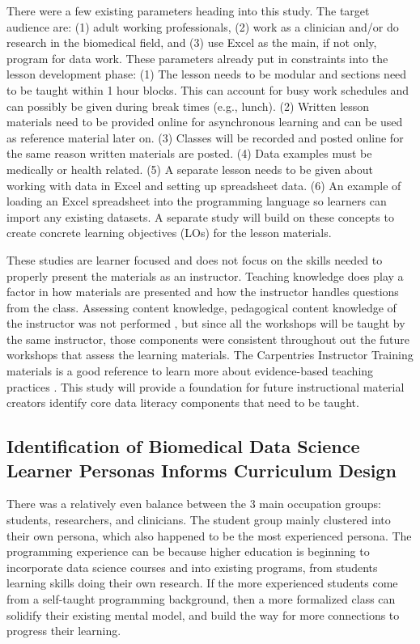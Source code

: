 \documentclass[020-persona\_validation.tex]{subfiles}
\begin{document}
    
    There were a few existing parameters heading into this study.
    The target audience are:
    (1) adult working professionals,
    (2) work as a clinician and/or do research in the biomedical field, and
    (3) use Excel as the main, if not only, program for data work.
    These parameters already put in constraints into the lesson development phase:
    (1) The lesson needs to be modular and sections need to be taught within 1 hour blocks.
    This can account for busy work schedules and can possibly be given during break times (e.g., lunch).
    (2) Written lesson materials need to be provided online for asynchronous learning and can be used as reference material later on.
    (3) Classes will be recorded and posted online for the same reason written materials are posted.
    (4) Data examples must be medically or health related.
    (5) A separate lesson needs to be given about working with data in Excel and setting up spreadsheet data.
    (6) An example of loading an Excel spreadsheet into the programming language so learners can import any existing datasets.
    A separate study will build on these concepts to create concrete learning objectives (LOs) for the lesson materials.
    
    These studies are learner focused and does not focus on the skills needed to properly present the materials as an instructor.
    Teaching knowledge does play a factor in how materials are presented and how the instructor handles questions from the class.
    Assessing content knowledge, pedagogical content knowledge of the instructor was not performed
    \cite{shulmanThoseWhoUnderstand1986},
    but since all the workshops will be taught by the same instructor, those components were consistent throughout out
    the future workshops that assess the learning materials.
    The Carpentries Instructor Training materials is a good reference to learn more about evidence-based teaching practices
    \cite{Koch2016}.
    This study will provide a foundation for future instructional material creators identify core data literacy components
    that need to be taught.

    \subsection{Identification of Biomedical Data Science Learner Personas Informs Curriculum Design}

        There was a relatively even balance between the 3 main occupation groups: students, researchers, and clinicians.
        The student group mainly clustered into their own persona,
        which also happened to be the most experienced persona.
        The programming experience can be because higher education is beginning to incorporate data science courses and
        into existing programs,
        from students learning skills doing their own research.
        If the more experienced students come from a self-taught programming background,
        then a more formalized class can solidify their existing mental model,
        and build the way for more connections to progress their learning.
\end{document}
